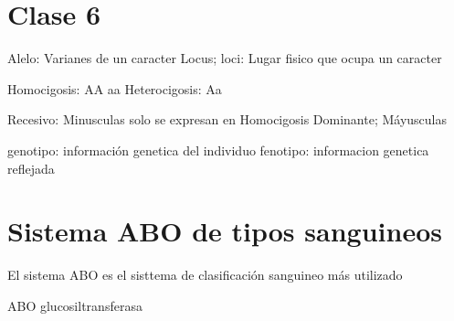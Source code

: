 \section{Clase 6}

Alelo: Varianes de un caracter
Locus; loci: Lugar fisico que ocupa un caracter

Homocigosis:     AA    aa
Heterocigosis:   Aa

Recesivo: Minusculas  solo se expresan en Homocigosis
Dominante; Máyusculas

genotipo: información genetica del individuo
fenotipo: informacion genetica reflejada


\section{Sistema ABO de tipos sanguineos}

El sistema ABO es el sisttema de clasificación sanguineo más utilizado




ABO glucosiltransferasa



